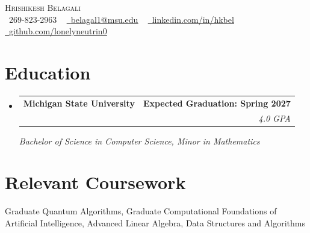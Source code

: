 \documentclass[letterpaper,11pt]{article}
\makeatletter
\newcommand{\resumeSubheading}[4]{
  \vspace{-2pt}\item
    \begin{tabular*}{1.0\textwidth}[t]{l@{\extracolsep{\fill}}r}
      \textbf{#1} & \textbf{\small #2} \\
      \textit{\small#3} & \textit{\small #4} \\
    \end{tabular*}\vspace{-7pt}
}
\newcommand{\resumeSubHeadingListStart}{\begin{itemize}[leftmargin=0.0in, label={}]}
\newcommand{\resumeSubHeadingListEnd}{\end{itemize}}
\makeatother
\begin{document}

\begin{center}
    {\Huge \scshape Hrishikesh Belagali} \\ \vspace{1pt}
    \vspace{1pt}
    \small {}
    \small \raisebox{-0.1\height}\faPhone\ 269-823-2963 ~ \href{belagal1@msu.edu}{\raisebox{-0.2\height}\faEnvelope\  \underline{belagal1@msu.edu}} ~ 
    \href{https://linkedin.com/in/hkbel}{\raisebox{-0.2\height}\faLinkedin\ \underline{linkedin.com/in/hkbel}}  ~
    \href{https://github.com/lonelyneutrin0}{\raisebox{-0.2\height}\faGithub\ \underline{github.com/lonelyneutrin0}}
    \vspace{-8pt}
\end{center}


\section{Education}
  \resumeSubHeadingListStart
    \resumeSubheading
      {Michigan State University}{Expected Graduation: Spring 2027}
      {}{4.0 GPA}
      \vspace*{-2pt}
      \textit{Bachelor of Science in Computer Science, Minor in Mathematics}\\ 
  \resumeSubHeadingListEnd
  \section{Relevant Coursework}
\begin{itemize}[leftmargin=0.15in, label={}]
  \small{\item{
    Graduate Quantum Algorithms, Graduate Computational Foundations of Artificial Intelligence,
    Advanced Linear Algebra, Data Structures and Algorithms
  }}
\end{itemize}
\end{document}
